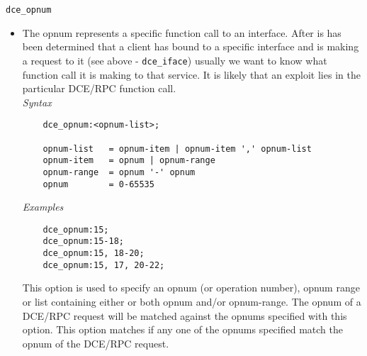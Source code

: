\documentclass[english]{report}
\begin{document}
\texttt{dce\_opnum}
\label{dcerpc2:dce_opnum}
\begin{itemize}

\item[] The opnum represents a specific function call to an interface. After is
has been determined that a client has bound to a specific interface and is
making a request to it (see above - \texttt{dce\_iface}) usually we want to
know what function call it is making to that service. It is likely that an
exploit lies in the particular DCE/RPC function call.\\

\textit{Syntax}
\footnotesize
\begin{verbatim}
    dce_opnum:<opnum-list>;

    opnum-list   = opnum-item | opnum-item ',' opnum-list
    opnum-item   = opnum | opnum-range
    opnum-range  = opnum '-' opnum
    opnum        = 0-65535
\end{verbatim}
\normalsize
\textit{Examples}
\footnotesize
\begin{verbatim}
    dce_opnum:15;
    dce_opnum:15-18;
    dce_opnum:15, 18-20;
    dce_opnum:15, 17, 20-22;
\end{verbatim}
\normalsize

This option is used to specify an opnum (or operation number), opnum range or
list containing either or both opnum and/or opnum-range. The opnum of a DCE/RPC
request will be matched against the opnums specified with this option.  This
option matches if any one of the opnums specified match the opnum of the
DCE/RPC request.

\end{itemize}
\end{document}
